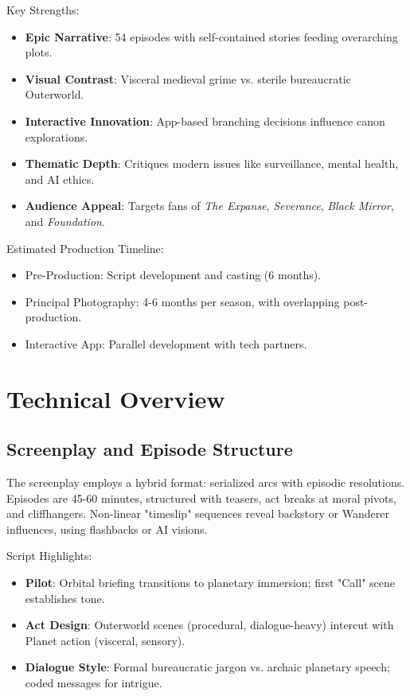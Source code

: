 \documentclass[10pt,letterpaper]{article}
\begin{document}
Key Strengths:
\begin{itemize}
    \item \textbf{Epic Narrative}: 54 episodes with self-contained stories feeding overarching plots.
    \item \textbf{Visual Contrast}: Visceral medieval grime vs. sterile bureaucratic Outerworld.
    \item \textbf{Interactive Innovation}: App-based branching decisions influence canon explorations.
    \item \textbf{Thematic Depth}: Critiques modern issues like surveillance, mental health, and AI ethics.
    \item \textbf{Audience Appeal}: Targets fans of \textit{The Expanse}, \textit{Severance}, \textit{Black Mirror}, and \textit{Foundation}.
\end{itemize}

Estimated Production Timeline:
\begin{itemize}
    \item Pre-Production: Script development and casting (6 months).
    \item Principal Photography: 4-6 months per season, with overlapping post-production.
    \item Interactive App: Parallel development with tech partners.
\end{itemize}

\section{Technical Overview}
\subsection{Screenplay and Episode Structure}
The screenplay employs a hybrid format: serialized arcs with episodic resolutions. Episodes are 45-60 minutes, structured with teasers, act breaks at moral pivots, and cliffhangers. Non-linear "timeslip" sequences reveal backstory or Wanderer influences, using flashbacks or AI visions.

Script Highlights:
\begin{itemize}
    \item \textbf{Pilot}: Orbital briefing transitions to planetary immersion; first "Call" scene establishes tone.
    \item \textbf{Act Design}: Outerworld scenes (procedural, dialogue-heavy) intercut with Planet action (visceral, sensory).
    \item \textbf{Dialogue Style}: Formal bureaucratic jargon vs. archaic planetary speech; coded messages for intrigue.
\end{itemize}
\end{document}
